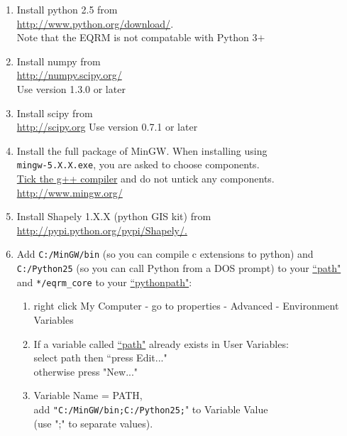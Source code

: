 \documentclass[a4paper, 12pt]{article}
\begin{document}
\begin{enumerate}

\item Install python 2.5 from \\
\url{http://www.python.org/download/}. \\
Note that the EQRM is not compatable with Python 3$+$ \\

\item Install numpy from \\
  \url{http://numpy.scipy.org/} \\
  Use version 1.3.0 or later \\

\item Install scipy from \\
 \url{http://scipy.org}
 Use version 0.7.1 or later \\

\item Install the full package of MinGW.
When installing using \\
\texttt{mingw-5.X.X.exe}, you are
asked to choose components.  \\
\underline{Tick the g++ compiler} and do not untick any components. \\
 \url{http://www.mingw.org/}

\item Install Shapely 1.X.X (python GIS kit) from \\
\url{http://pypi.python.org/pypi/Shapely/.}

\item Add \texttt{C:/MinGW/bin} (so you can compile c extensions
to python) and \texttt{C:/Python25} (so you can call Python from a
DOS prompt) to your \underline{``path"} and \texttt{*/eqrm\_core} to
your \underline{``pythonpath"}:
\begin{enumerate}

\item right click My Computer - go to properties - Advanced - Environment Variables

\item If a variable called \underline{``path"} already exists in User
Variables: \\
select path then ``press Edit..." \\
otherwise press "New..." \\

\item Variable Name = PATH, \\
add \texttt{"C:/MinGW/bin;C:/Python25;}" to  Variable Value \\
(use ";" to separate values).


\end{enumerate}
\end{enumerate}
\end{document}
